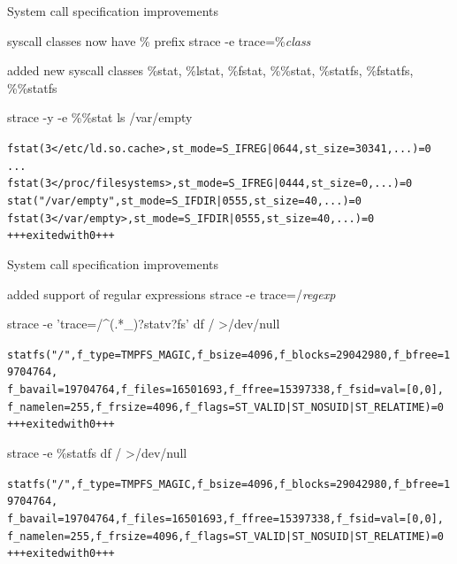 \documentclass[unicode,aspectratio=169]{beamer}
\begin{document}
\begin{frame}[fragile]{System call specification improvements}
\begin{block}{\large syscall classes now have \% prefix}
strace -e trace=\%\textit{class}
\end{block}
\begin{block}{added new syscall classes}
\%stat, \%lstat, \%fstat, \%\%stat, \%statfs, \%fstatfs, \%\%statfs
\end{block}
\begin{block}{strace -y -e \%\%stat ls /var/empty}
\begin{small}
\begin{alltt}
fstat(3</etc/ld.so.cache>, {st_mode=S_IFREG|0644, st_size=30341, ...}) = 0
...
fstat(3</proc/filesystems>, {st_mode=S_IFREG|0444, st_size=0, ...}) = 0
stat("/var/empty", {st_mode=S_IFDIR|0555, st_size=40, ...}) = 0
fstat(3</var/empty>, {st_mode=S_IFDIR|0555, st_size=40, ...}) = 0
+++ exited with 0 +++
\end{alltt}
\end{small}
\end{block}
\end{frame}

\begin{frame}[fragile]{System call specification improvements}
\begin{block}{\large added support of regular expressions}
strace -e trace=/\textit{regexp}
\end{block}
\begin{block}{strace -e 'trace=/\textasciicircum(.*\_)?statv?fs' df / >/dev/null}
\begin{small}
\begin{alltt}
statfs("/", {f_type=TMPFS_MAGIC, f_bsize=4096, f_blocks=29042980, f_bfree=19704764,
  f_bavail=19704764, f_files=16501693, f_ffree=15397338, f_fsid={val=[0, 0]},
  f_namelen=255, f_frsize=4096, f_flags=ST_VALID|ST_NOSUID|ST_RELATIME}) = 0
+++ exited with 0 +++
\end{alltt}
\end{small}
\end{block}
\begin{block}{strace -e \%statfs df / >/dev/null}
\begin{small}
\begin{alltt}
statfs("/", {f_type=TMPFS_MAGIC, f_bsize=4096, f_blocks=29042980, f_bfree=19704764,
  f_bavail=19704764, f_files=16501693, f_ffree=15397338, f_fsid={val=[0, 0]},
  f_namelen=255, f_frsize=4096, f_flags=ST_VALID|ST_NOSUID|ST_RELATIME}) = 0
+++ exited with 0 +++
\end{alltt}
\end{small}
\end{block}
\end{frame}
\end{document}
